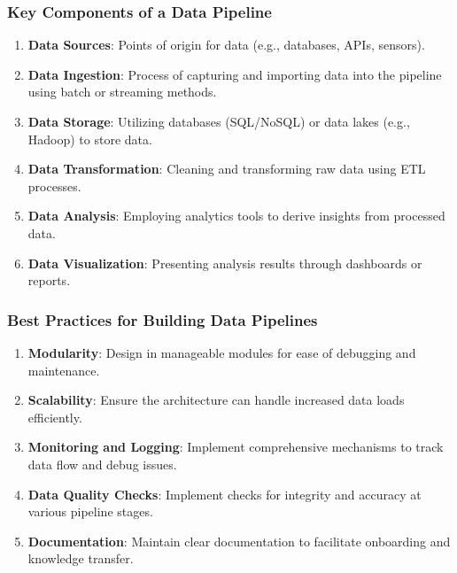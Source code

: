 \documentclass[aspectratio=169]{beamer}
\begin{document}
\begin{frame}[fragile]
    \frametitle{Key Components of a Data Pipeline}
    \begin{enumerate}
        \item \textbf{Data Sources}: Points of origin for data (e.g., databases, APIs, sensors).
        \item \textbf{Data Ingestion}: Process of capturing and importing data into the pipeline using batch or streaming methods.
        \item \textbf{Data Storage}: Utilizing databases (SQL/NoSQL) or data lakes (e.g., Hadoop) to store data.
        \item \textbf{Data Transformation}: Cleaning and transforming raw data using ETL processes.
        \item \textbf{Data Analysis}: Employing analytics tools to derive insights from processed data.
        \item \textbf{Data Visualization}: Presenting analysis results through dashboards or reports.
    \end{enumerate}
\end{frame}

\begin{frame}[fragile]
    \frametitle{Best Practices for Building Data Pipelines}
    \begin{enumerate}
        \item \textbf{Modularity}: Design in manageable modules for ease of debugging and maintenance.
        \item \textbf{Scalability}: Ensure the architecture can handle increased data loads efficiently.
        \item \textbf{Monitoring and Logging}: Implement comprehensive mechanisms to track data flow and debug issues.
        \item \textbf{Data Quality Checks}: Implement checks for integrity and accuracy at various pipeline stages.
        \item \textbf{Documentation}: Maintain clear documentation to facilitate onboarding and knowledge transfer.
    \end{enumerate}
\end{frame}
\end{document}
